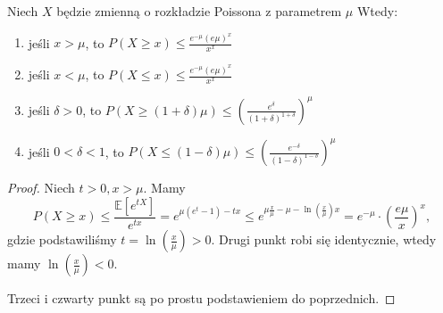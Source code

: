 \begin{theorem}
    Niech \(X\) będzie zmienną o rozkładzie Poissona z parametrem \(\mu\) Wtedy:
    \begin{enumerate}
        \item jeśli \(x>\mu\), to \(P \left( X \ge x \right) \le \frac{e^{-\mu} \left( e\mu \right) ^{x}}{x^{x}}\)
        \item jeśli \(x < \mu\), to \(P \left( X \le x \right) \le \frac{e^{-\mu} \left( e\mu \right) ^{x}}{x^{x}}\)
        \item jeśli \(\delta > 0\), to \(P \left( X \ge \left( 1+\delta \right) \mu \right) \le \left( \frac{e^{\delta}}{ \left( 1+\delta \right) ^{1+\delta}} \right) ^{\mu}\)
        \item jeśli \(0 < \delta < 1\), to \(P \left( X \le \left( 1-\delta \right) \mu \right) \le \left( \frac{e^{-\delta}}{ \left( 1-\delta \right) ^{1-\delta}} \right) ^{\mu}\)
    \end{enumerate}
\end{theorem}
\begin{proof}
    Niech \(t>0, x>\mu\). Mamy \[ P \left( X\ge x \right) \le \frac{\mathbb{E} \left[ e^{tX} \right] }{e^{tx}} = e^{\mu \left( e^{t}-1 \right) -tx}  \le e^{\mu \frac{x}{\mu}- \mu-\ln \left( \frac{x}{\mu} \right) x} = e^{-\mu}\cdot \left( \frac{e\mu}{x} \right) ^{x} ,\] 
    gdzie podstawiliśmy \(t= \ln \left( \frac{x}{\mu} \right) > 0 \). Drugi punkt robi się identycznie, wtedy mamy \(\ln \left( \frac{x}{\mu} \right) < 0\).

    Trzeci i czwarty punkt są po prostu podstawieniem do poprzednich.
\end{proof}

